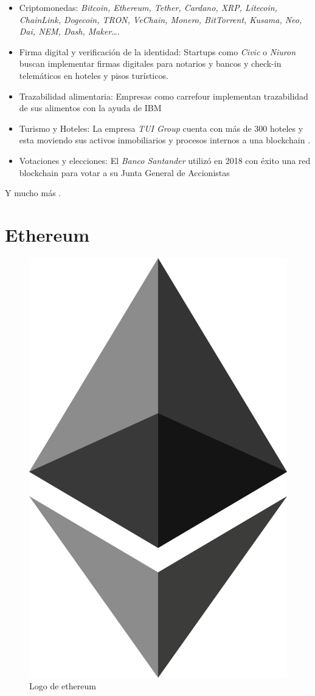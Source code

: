 \begin{itemize}
\item Criptomonedas: \textit{Bitcoin, Ethereum, Tether, Cardano, XRP, Litecoin, ChainLink, Dogecoin, TRON, VeChain, Monero, BitTorrent, Kusama, Neo, Dai, NEM, Dash, Maker}\dots \cite{listaCripto}.
\item Firma digital y verificación de la identidad: Startups como \textit{Civic} o \textit{Niuron}\cite{civic, niuron} buscan implementar firmas digitales para notarios y bancos y check-in telemáticos en hoteles y pisos turísticos.
\item Trazabilidad alimentaria: Empresas como carrefour implementan trazabilidad de sus alimentos con la ayuda de IBM \cite{carrefour}
\item Turismo y Hoteles: La empresa \textit{TUI Group} cuenta con más de 300 hoteles y esta moviendo sus activos inmobiliarios y procesos internos a una blockchain \cite{tuig}.
\item Votaciones y elecciones: El \textit{Banco Santander} utilizó en 2018 con éxito una red blockchain para votar a su Junta General de Accionistas\cite{santanderVotacion}
\end{itemize}

Y mucho más \cite{appCripto}.

\section{Ethereum}

\begin{figure}[h!]
  \centering
  \includegraphics[width=0.6\linewidth]{figs/EstadoArte/Ethereum/ethereumLOGO}
  \caption[Ethereum]{Logo de ethereum}
  \label{fig:ethereum}
\end{figure}

